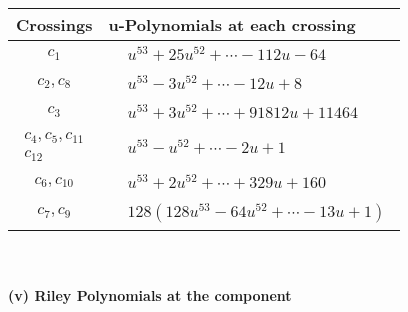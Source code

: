 \documentclass[1p]{elsarticle_modified}
\theoremstyle{definition}
\begin{document}
\begin{tabular}{m{50pt}|m{274pt}}
Crossings & \hspace{64pt}u-Polynomials at each crossing \\
\hline $$\begin{aligned}c_{1}\end{aligned}$$&$\begin{aligned}
&u^{53}+25 u^{52}+\cdots-112 u-64
\end{aligned}$\\
\hline $$\begin{aligned}c_{2},c_{8}\end{aligned}$$&$\begin{aligned}
&u^{53}-3 u^{52}+\cdots-12 u+8
\end{aligned}$\\
\hline $$\begin{aligned}c_{3}\end{aligned}$$&$\begin{aligned}
&u^{53}+3 u^{52}+\cdots+91812 u+11464
\end{aligned}$\\
\hline $$\begin{aligned}c_{4},c_{5},c_{11}\\c_{12}\end{aligned}$$&$\begin{aligned}
&u^{53}- u^{52}+\cdots-2 u+1
\end{aligned}$\\
\hline $$\begin{aligned}c_{6},c_{10}\end{aligned}$$&$\begin{aligned}
&u^{53}+2 u^{52}+\cdots+329 u+160
\end{aligned}$\\
\hline $$\begin{aligned}c_{7},c_{9}\end{aligned}$$&$\begin{aligned}
&128(128 u^{53}-64 u^{52}+\cdots-13 u+1)
\end{aligned}$\\
\hline
\end{tabular}\\~\\
\newpage\renewcommand{\arraystretch}{1}
\flushleft \textbf{(v) Riley Polynomials at the component}\newline \\
\end{document}
